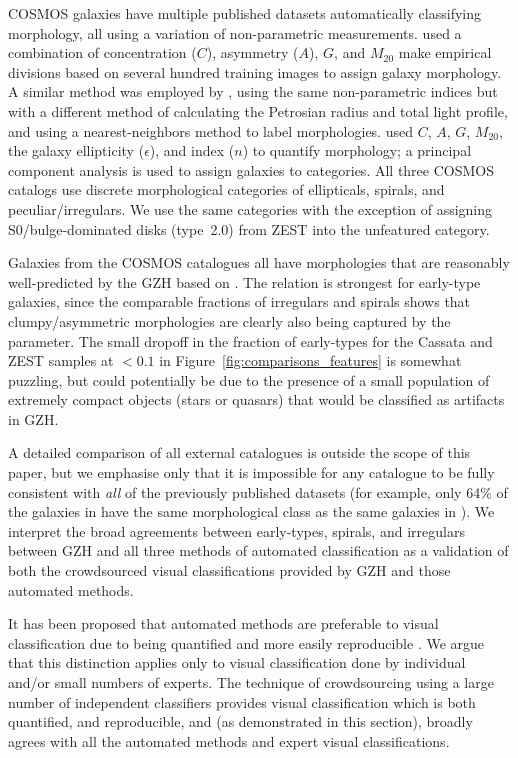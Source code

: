 \documentclass[a4paper,fleqn,usenatbib]{mnras}
\begin{document}
COSMOS galaxies have multiple published datasets automatically classifying
morphology, all using a variation of non-parametric measurements. \citet{cas07}
used a combination of concentration ($C$), asymmetry ($A$), $G$, and $M_{20}$
\citep{cas05} make empirical divisions based on several hundred training images
to assign galaxy morphology. A similar method was employed by \citet{tas11},
using the same non-parametric indices but with a different method of
calculating the Petrosian radius and total light profile, and using a
nearest-neighbors method to label morphologies. \citet[][ZEST]{sca07} used $C$,
$A$, $G$, $M_{20}$, the galaxy ellipticity ($\epsilon$), and \sersic{} index
($n$) to quantify morphology; a principal component analysis is used to assign
galaxies to categories. All three COSMOS catalogs use discrete morphological categories
of ellipticals, spirals, and peculiar/irregulars. We use the same categories
with the exception of assigning S0/bulge-dominated disks (type~2.0) from ZEST
into the unfeatured category.

Galaxies from the COSMOS catalogues all have morphologies that are
reasonably well-predicted by the GZH based on \fbest. The relation is strongest
for early-type galaxies, since the comparable fractions of irregulars and
spirals shows that clumpy/asymmetric morphologies are clearly also being
captured by the \fbest{} parameter. The small dropoff in the fraction of
early-types for the Cassata and ZEST samples at \fbest$<0.1$ in
Figure~\ref{fig:comparisons_features} is somewhat puzzling, but could
potentially be due to the presence of a small population of extremely
compact objects (stars or quasars) that would be classified as artifacts in
GZH.

A detailed comparison of all external catalogues is outside the scope of this
paper, but we emphasise only that it is impossible for any catalogue to be fully
consistent with \emph{all} of the previously published datasets (for example, only
64\% of the galaxies in \citealt{tas11} have the same morphological class as
the same galaxies in \citealt{cas07}). We interpret the broad agreements
between early-types, spirals, and irregulars between GZH and all three methods
of automated classification as a validation of both the crowdsourced visual
classifications provided by GZH and those automated methods.

It has been proposed that automated methods are preferable to visual
classification due to being quantified and more easily reproducible
\citep[\eg,][]{con14,paw16}. We argue that this distinction applies only to
visual classification done by individual and/or small numbers of experts. The
technique of crowdsourcing using a large number of independent classifiers
provides visual classification which is both quantified, and reproducible, and
(as demonstrated in this section), broadly agrees with all the automated
methods and expert visual classifications.
\end{document}
